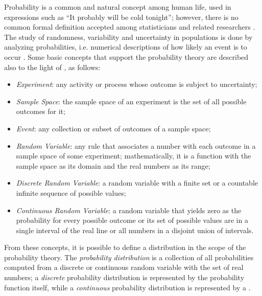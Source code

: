 Probability is a common and natural concept among human life, used in expressions such as ``It probably will be cold tonight''; however, there is no common formal definition accepted among statisticians and related researchers \cite{degroot2012probability}. The study of randomness, variability and uncertainty in populations is done by analyzing probabilities, i.e. numerical descriptions of how likely an event is to occur \cite{devore2011probability}. Some basic concepts that support the probability theory are described also to the light of , as follows:

\begin{itemize}
    \item \emph{Experiment}: any activity or process whose outcome is subject to uncertainty;
    
    \item \emph{Sample Space}: the sample space of an experiment is the set of all possible outcomes for it;
    
    \item \emph{Event}: any collection or subset of outcomes of a sample space;
    
    \item \emph{Random Variable}: any rule that associates a number with each outcome in a sample space of some experiment; mathematically, it is a function with the sample space as its domain and the real numbers as its range;
    
    \item \emph{Discrete Random Variable}: a random variable with a finite set or a countable infinite sequence of possible values;
    
    \item \emph{Continuous Random Variable}: a random variable that yields zero as the probability for every possible outcome or its set of possible values are in a single interval of the real line or all numbers in a disjoint union of intervals.
    
\end{itemize}

From these concepts, it is possible to define a distribution in the scope of the probability theory. The \emph{probability distribution} is a collection of all probabilities computed from a  discrete or continuous random variable with the set of real numbers; a \emph{discrete} probability distribution is represented by the probability function itself, while a \emph{continuous} probability distribution is represented by a  \cite{mendenhall2016statistics}.


